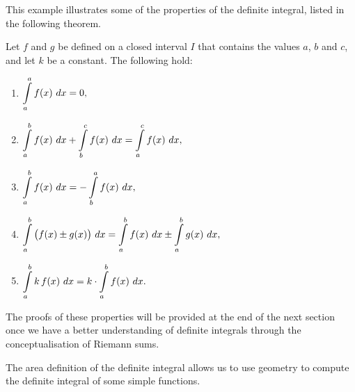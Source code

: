 This example illustrates some of the properties of the definite integral, listed in the following theorem.

\begin{theorem}\label{thm:defintprop}
Let $f$ and $g$ be defined on a closed interval $I$ that contains the values $a$, $b$ and $c$, and let $k$ be a constant. The following hold:
		\begin{enumerate}
		\item		$\displaystyle \int\limits_a^a f(x)\ dx = 0,$
		\item		$\displaystyle \int\limits_a^b f(x)\ dx + \int\limits_b^c f(x)\ dx = \int\limits_a^cf(x)\ dx,$
		\item		$\displaystyle \int\limits_a^bf(x)\ dx = -\int\limits_b^a f(x)\ dx,$
		\item		$\ds \int\limits_a^b\big(f(x)\pm g(x)\big)\ dx = \int\limits_a^bf(x)\ dx \pm \int\limits_a^bg(x)\ dx,$
		\item		$\displaystyle \int\limits_a^bk\, f(x)\ dx = k\cdot\int\limits_a^bf(x)\ dx.$
		\end{enumerate}
\end{theorem}

\ifanalysis

The proofs of these properties will be provided at the end of the next section once we have a better understanding of definite integrals through the conceptualisation of Riemann sums.

\fi
The area definition of the definite integral allows us to use geometry to compute the definite integral of some simple functions.\\

